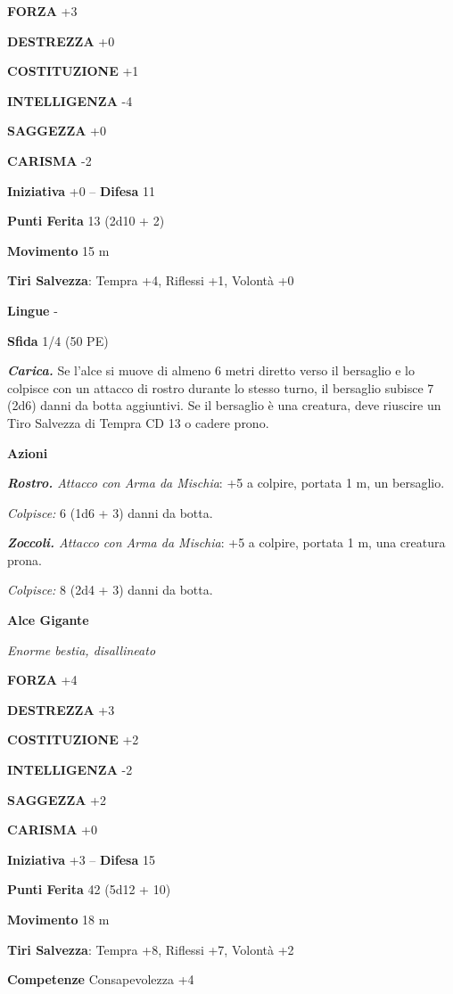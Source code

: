 \begin{multicols}{2}
\textbf{FORZA} +3

\textbf{DESTREZZA} +0

\textbf{COSTITUZIONE} +1

\textbf{INTELLIGENZA} -4

\textbf{SAGGEZZA} +0

\textbf{CARISMA} -2

\textbf{Iniziativa} +0 -- \textbf{Difesa} 11

\textbf{Punti Ferita} 13 (2d10 + 2)

\textbf{Movimento} 15 m

\textbf{Tiri Salvezza}:  Tempra +4, Riflessi +1, Volontà +0

\textbf{Lingue} -

\textbf{Sfida} 1/4 (50 PE)

\emph{\textbf{Carica.}} Se l'alce si muove di almeno 6 metri diretto verso il bersaglio e lo colpisce con un attacco di rostro durante lo stesso turno, il bersaglio subisce 7 (2d6) danni da botta aggiuntivi. Se il bersaglio è una creatura, deve riuscire un Tiro Salvezza di Tempra
CD 13 o cadere prono.

\textbf{Azioni}

\emph{\textbf{Rostro.} Attacco con Arma da Mischia}: +5 a colpire, portata 1 m, un bersaglio.

\emph{Colpisce:} 6 (1d6 + 3) danni da botta.

\emph{\textbf{Zoccoli.} Attacco con Arma da Mischia}: +5 a colpire, portata 1 m, una creatura prona.

\emph{Colpisce:} 8 (2d4 + 3) danni da botta.

\medskip\textbf{Alce Gigante}

\emph{Enorme bestia, disallineato}

\textbf{FORZA} +4

\textbf{DESTREZZA} +3

\textbf{COSTITUZIONE} +2

\textbf{INTELLIGENZA} -2

\textbf{SAGGEZZA} +2

\textbf{CARISMA} +0

\textbf{Iniziativa} +3 -- \textbf{Difesa} 15

\textbf{Punti Ferita} 42 (5d12 + 10)

\textbf{Movimento} 18 m

\textbf{Tiri Salvezza}:  Tempra +8, Riflessi +7, Volontà +2

\textbf{Competenze} Consapevolezza +4


\end{multicols}

